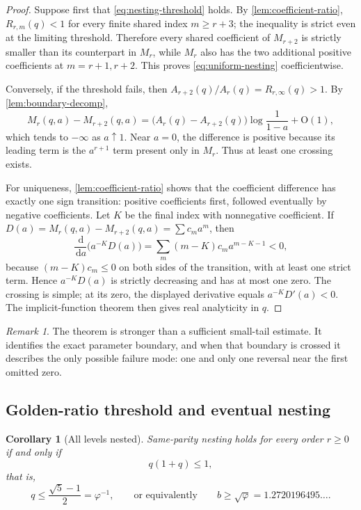 \documentclass[11pt,oneside]{article}
\numberwithin{equation}{section}
\theoremstyle{frontier}
\newtheorem{corollary}[theorem]{Corollary}
\theoremstyle{definition}
\theoremstyle{remark}
\newtheorem{remark}[theorem]{Remark}
\newcommand{\dd}{\,\mathrm d}
\newcommand{\bigO}{\mathrm O}
\begin{document}
\begin{proof}
Suppose first that \eqref{eq:nesting-threshold} holds.  By
\cref{lem:coefficient-ratio}, $R_{r,m}(q)<1$ for every finite shared index
$m\ge r+3$; the inequality is strict even at the limiting threshold.  Therefore every shared
coefficient of $M_{r+2}$ is strictly smaller than its counterpart in $M_r$, while $M_r$ also
has the two additional positive coefficients at $m=r+1,r+2$.  This proves
\eqref{eq:uniform-nesting} coefficientwise.

Conversely, if the threshold fails, then $A_{r+2}(q)/A_r(q)=R_{r,\infty}(q)>1$.
By \cref{lem:boundary-decomp},
\[
 M_r(q,a)-M_{r+2}(q,a)
 =\bigl(A_r(q)-A_{r+2}(q)\bigr)\log\frac1{1-a}+\bigO(1),
\]
which tends to $-\infty$ as $a\uparrow1$.  Near $a=0$, the difference is positive because
its leading term is the $a^{r+1}$ term present only in $M_r$.  Thus at least one crossing
exists.

For uniqueness, \cref{lem:coefficient-ratio} shows that the coefficient difference has
exactly one sign transition: positive coefficients first, followed eventually by negative
coefficients.  Let $K$ be the final index with nonnegative coefficient.  If
$D(a)=M_r(q,a)-M_{r+2}(q,a)=\sum c_ma^m$, then
\[
 \frac{\dd}{\dd a}\bigl(a^{-K}D(a)\bigr)
 =\sum_m(m-K)c_ma^{m-K-1}<0,
 \]
because $(m-K)c_m\le0$ on both sides of the transition, with at least one strict term.
Hence $a^{-K}D(a)$ is strictly decreasing and has at most one zero.  The crossing is simple;
at its zero, the displayed derivative equals $a^{-K}D'(a)<0$.  The implicit-function theorem
then gives real analyticity in $q$.
\end{proof}

\begin{remark}
The theorem is stronger than a sufficient small-tail estimate.  It identifies the exact
parameter boundary, and when that boundary is crossed it describes the only possible
failure mode: one and only one reversal near the first omitted zero.
\end{remark}

\subsection{Golden-ratio threshold and eventual nesting}

\begin{corollary}[All levels nested]\label{cor:golden-threshold}
Same-parity nesting holds for every order $r\ge0$ if and only if
\begin{equation}
 q(1+q)\le1,
 \end{equation}
that is,
\begin{equation}
 q\le\frac{\sqrt5-1}{2}=\varphi^{-1},
 \qquad\text{or equivalently}\qquad
 b\ge\sqrt\varphi=1.2720196495\ldots.
 \label{eq:golden-base}
\end{equation}
\end{corollary}
\end{document}

